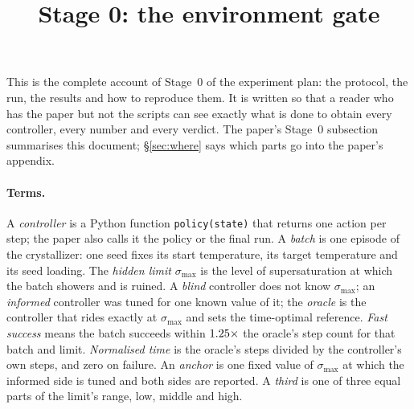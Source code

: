 \documentclass[11pt,a4paper]{article}
\title{\textbf{Stage 0: the environment gate}}
\author{}
\date{\SZdate}
\newcommand{\smax}{\sigma_{\max}}
\begin{document}
\maketitle

\noindent
This is the complete account of Stage~0 of the experiment plan: the protocol,
the run, the results and how to reproduce them. It is written so that a reader
who has the paper but not the scripts can see exactly what is done to obtain
every controller, every number and every verdict. The paper's Stage~0
subsection summarises this document; \S\ref{sec:where} says which parts go
into the paper's appendix.


\paragraph{Terms.} A \emph{controller} is a Python function
\texttt{policy(state)} that returns one action per step; the paper also calls
it the policy or the final run. A \emph{batch} is one episode of the
crystallizer: one seed fixes its start temperature, its target temperature
and its seed loading. The \emph{hidden limit} $\smax$ is the level of
supersaturation at which the batch showers and is ruined. A \emph{blind}
controller does not know $\smax$; an \emph{informed} controller was tuned for
one known value of it; the \emph{oracle} is the controller that rides
exactly at $\smax$ and sets the time-optimal reference. \emph{Fast success}
means the batch succeeds within $1.25\times$ the oracle's step count
for that batch and limit. \emph{Normalised time} is the oracle's steps divided
by the controller's own steps, and zero on failure. An \emph{anchor} is one
fixed value of $\smax$ at which the informed side is tuned and both sides are
reported. A \emph{third} is one of three equal parts of the limit's range,
low, middle and high.
\end{document}
